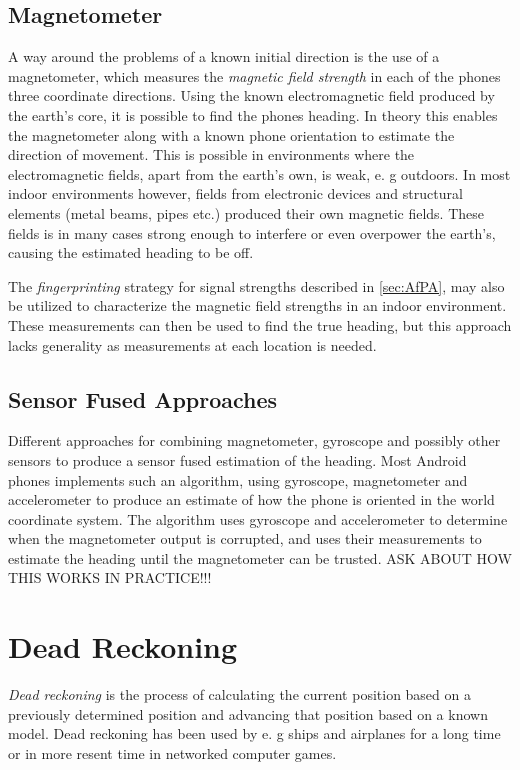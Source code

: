 \documentclass{LTHthesis}
\begin{document}
\subsection{Magnetometer}
%
A way around the problems of a known initial direction is the use of a magnetometer, which measures the \emph{magnetic field strength} in each of the phones three coordinate directions. Using the known electromagnetic field produced by the earth’s core, it is possible to find the phones heading. In theory this enables the magnetometer along with a known phone orientation to estimate the direction of movement. This is possible in environments where the electromagnetic fields, apart from the earth’s own, is weak, e. g outdoors. In most indoor environments however, fields from electronic devices and structural elements (metal beams, pipes etc.) produced their own magnetic fields. These fields is in many cases strong enough to interfere or even overpower the earth’s, causing the estimated heading to be off. 

The \emph{fingerprinting} strategy for signal strengths described in \ref{sec:AfPA}, may also be utilized to characterize the magnetic field strengths in an indoor environment. These measurements can then be used to find the true heading, but this approach lacks generality as measurements at each location is needed.  
%
\subsection{Sensor Fused Approaches}
%
Different approaches for combining magnetometer, gyroscope and possibly other sensors to produce a sensor fused estimation of the heading. Most Android phones implements such an algorithm, using gyroscope, magnetometer and accelerometer to produce an estimate of how the phone is oriented in the world coordinate system. The algorithm uses gyroscope and accelerometer to determine when the magnetometer output is corrupted, and uses their measurements to estimate the heading until the magnetometer can be trusted. ASK ABOUT HOW THIS WORKS IN PRACTICE!!!
%
\section{Dead Reckoning}
%
\emph{Dead reckoning} is the process of calculating the current position based on a previously determined position and advancing that position based on a known model. Dead reckoning has been used by e. g ships and airplanes for a long time or in more resent time in networked computer games. 
\end{document}
